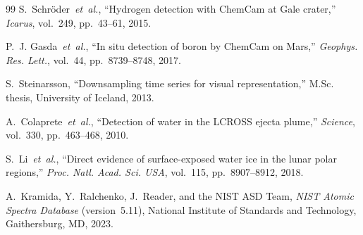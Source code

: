 \documentclass[a4paper,twocolumn,10pt]{article}
\begin{document}
\begin{thebibliography}{99}
S.~Schr\"oder~\emph{et~al.},
``Hydrogen detection with ChemCam at Gale crater,''
\textit{Icarus}, vol.~249, pp.~43--61, 2015.

P.~J. Gasda~\emph{et~al.},
``In situ detection of boron by ChemCam on Mars,''
\textit{Geophys. Res. Lett.}, vol.~44, pp.~8739--8748, 2017.

S.~Steinarsson,
``Downsampling time series for visual representation,''
M.Sc. thesis, University of Iceland, 2013.

A.~Colaprete~\emph{et~al.},
``Detection of water in the LCROSS ejecta plume,''
\textit{Science}, vol.~330, pp.~463--468, 2010.

S.~Li~\emph{et~al.},
``Direct evidence of surface-exposed water ice in the lunar polar
regions,''
\textit{Proc. Natl. Acad. Sci. USA}, vol.~115, pp.~8907--8912, 2018.

A.~Kramida, Y.~Ralchenko, J.~Reader, and the NIST ASD Team,
\textit{NIST Atomic Spectra Database} (version~5.11),
National Institute of Standards and Technology, Gaithersburg, MD,
2023.

\end{thebibliography}
\end{document}
